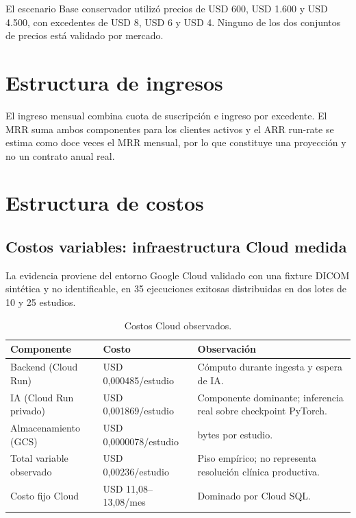 El escenario Base conservador utilizó precios de USD 600, USD 1.600 y USD 4.500, con excedentes de USD 8, USD 6 y USD 4. Ninguno de los dos conjuntos de precios está validado por mercado.

\section{Estructura de ingresos}

El ingreso mensual combina cuota de suscripción e ingreso por excedente. El MRR suma ambos componentes para los clientes activos y el ARR run-rate se estima como doce veces el MRR mensual, por lo que constituye una proyección y no un contrato anual real.

\section{Estructura de costos}

\subsection{Costos variables: infraestructura Cloud medida}

La evidencia proviene del entorno Google Cloud validado con una fixture DICOM sintética y no identificable, en 35 ejecuciones exitosas distribuidas en dos lotes de 10 y 25 estudios.

{\small
\begin{longtable}{>{\raggedright\arraybackslash}p{} >{\raggedright\arraybackslash}p{} >{\raggedright\arraybackslash}p{}}
\caption{Costos Cloud observados.}\label{tab:negocio-costos-cloud}\\
\hline
\textbf{Componente} & \textbf{Costo} & \textbf{Observación} \\
\hline
Backend (Cloud Run) & USD 0,000485/estudio & Cómputo durante ingesta y espera de IA. \\
IA (Cloud Run privado) & USD 0,001869/estudio & Componente dominante; inferencia real sobre checkpoint PyTorch. \\
Almacenamiento (GCS) & USD 0,0000078/estudio & 391.490 bytes por estudio. \\
Total variable observado & USD 0,00236/estudio & Piso empírico; no representa resolución clínica productiva. \\
Costo fijo Cloud & USD 11,08--13,08/mes & Dominado por Cloud SQL. \\
\hline
\end{longtable}
}

